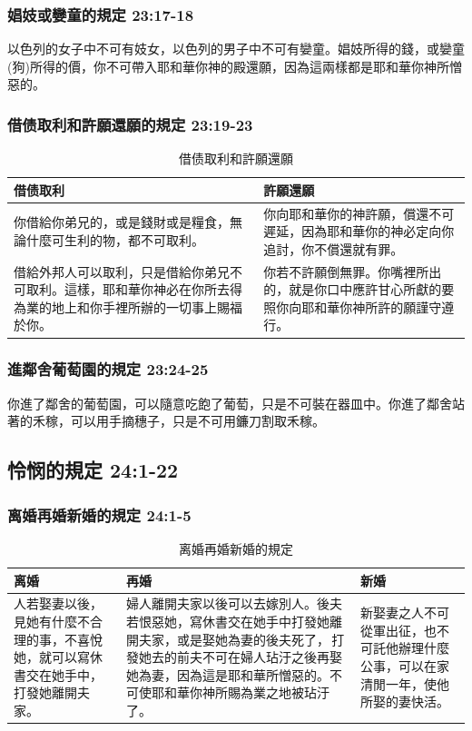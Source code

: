 \subsubsection{娼妓或孌童的規定 23:17-18 }
以色列的女子中不可有妓女，以色列的男子中不可有孌童。娼妓所得的錢，或孌童(狗)所得的價，你不可帶入耶和華你神的殿還願，因為這兩樣都是耶和華你神所憎惡的。

\subsubsection{借债取利和許願還願的規定 23:19-23 }
\begin{table}[H]
\begin{center}
\begin{tabular}{ p{}||p{}} \toprule
借债取利&許願還願\\\hline
你借給你弟兄的，或是錢財或是糧食，無論什麼可生利的物，都不可取利。
&你向耶和華你的神許願，償還不可遲延，因為耶和華你的神必定向你追討，你不償還就有罪。\\\hline
借給外邦人可以取利，只是借給你弟兄不可取利。這樣，耶和華你神必在你所去得為業的地上和你手裡所辦的一切事上賜福於你。&你若不許願倒無罪。你嘴裡所出的，就是你口中應許甘心所獻的要照你向耶和華你神所許的願謹守遵行。\\\hline
\end{tabular}
\end{center}
\caption{借债取利和許願還願}
\end{table}

\subsubsection{進鄰舍葡萄園的規定 23:24-25 }
你進了鄰舍的葡萄園，可以隨意吃飽了葡萄，只是不可裝在器皿中。你進了鄰舍站著的禾稼，可以用手摘穗子，只是不可用鐮刀割取禾稼。

\subsection{怜悯的規定 24:1-22}
\subsubsection{离婚再婚新婚的規定 24:1-5 }
\begin{table}[H]
\begin{center}
\begin{tabular}{ p{3.8cm}|p{9.2cm}|p{}} \toprule
离婚&再婚&新婚\\\hline
人若娶妻以後，見她有什麼不合理的事，不喜悅她，就可以寫休書交在她手中，打發她離開夫家。
&婦人離開夫家以後可以去嫁別人。後夫若恨惡她，寫休書交在她手中打發她離開夫家，或是娶她為妻的後夫死了， 打發她去的前夫不可在婦人玷汙之後再娶她為妻，因為這是耶和華所憎惡的。不可使耶和華你神所賜為業之地被玷汙了。
&新娶妻之人不可從軍出征，也不可託他辦理什麼公事，可以在家清閒一年，使他所娶的妻快活。\\\hline
\end{tabular}
\end{center}
\caption{离婚再婚新婚的規定}
\end{table}

